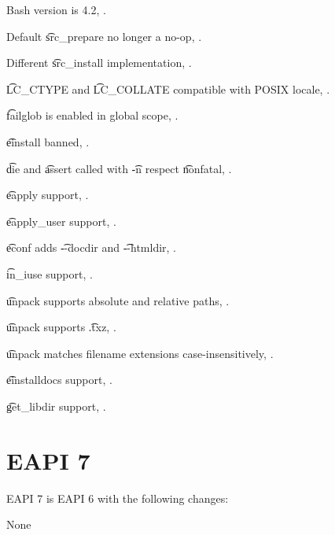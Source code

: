 \begin{compactitem}
\item Bash version is 4.2, .
\item Default \t{src_prepare} no longer a no-op, .
\item Different \t{src_install} implementation, .
\item \t{LC_CTYPE} and \t{LC_COLLATE} compatible with POSIX locale, .
\item \t{failglob} is enabled in global scope, .
\item \t{einstall} banned, .
\item \t{die} and \t{assert} called with \t{-n} respect \t{nonfatal}, .
\item \t{eapply} support, .
\item \t{eapply_user} support, .
\item \t{econf} adds \t{-{}-docdir} and \t{-{}-htmldir}, .
\item \t{in_iuse} support, .
\item \t{unpack} supports absolute and relative paths, .
\item \t{unpack} supports \t{.txz}, .
\item \t{unpack} matches filename extensions case-insensitively, .
\item \t{einstalldocs} support, .
\item \t{get_libdir} support, .
\end{compactitem}

\section{EAPI 7}

EAPI 7 is EAPI 6 with the following changes:

\begin{compactitem}
\item None
\end{compactitem}



